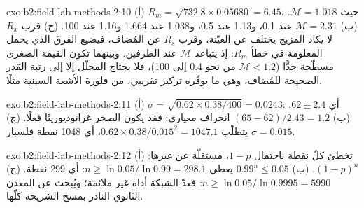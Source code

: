\begin{solution}{exo:b2:field-lab-methods-2:10}
(أ) $R_m = \sqrt{732.8 \times 0.05680} = 6.45$، حيث $\mathcal M = 1.018$. (ب) $\mathcal M = 2.31$
عند 0.1، و1.13 عند 0.5، و1.038 عند 1.664 و1.16 عند 100. (ج) قرب $R_x$ لا يكاد المزيج يختلف عن
العيّنة، وقرب $R_s$ عن المُضاف، فيضيع الفرق الذي يحمل المعلومة في
خطأ $R_m$: إذ يتباعد $\mathcal M$ عند الطرفين. وبينهما تكون القيمة الصغرى مسطّحة جدًّا
($\mathcal M < 1.2$ من نحو 0.4 إلى 100)، فلا يحتاج المحلّل إلا إلى رتبة القدر الصحيحة
للمُضاف، وهي ما يوفّره تركيز تقريبي، من فلورة الأشعة السينية مثلًا.
\end{solution}

\begin{solution}{exo:b2:field-lab-methods-2:11}
(أ) $\sigma = \sqrt{0.62 \times 0.38/400} = 0.0243$: أي $62 \pm 2.4$. (ب) $(65 - 62)/2.43 = 1.2$
انحراف معياري: فقد يكون الصخر غرانوديوريتًا فعلًا. (ج) $\sigma = 0.015$ يتطلّب $0.62 \times
0.38/0.015^2 = 1047.1$، أي 1048 نقطة فلسبار.
\end{solution}

\begin{solution}{exo:b2:field-lab-methods-2:12}
(أ) تخطئ كلّ نقطة باحتمال $1 - p$، مستقلّة عن غيرها: $(1-p)^n$. (ب) $0.99^n \le 0.05$
يعطي $n \ge \ln 0.05/\ln 0.99 = 298.1$: أي 299 نقطة. (ج) $n \ge \ln 0.05/\ln 0.9995 = 5990$: فعدّ الشبكة
أداة غير ملائمة؛ ويُبحث عن المعدن الثانوي النادر بمسح الشريحة كلّها.
\end{solution}

